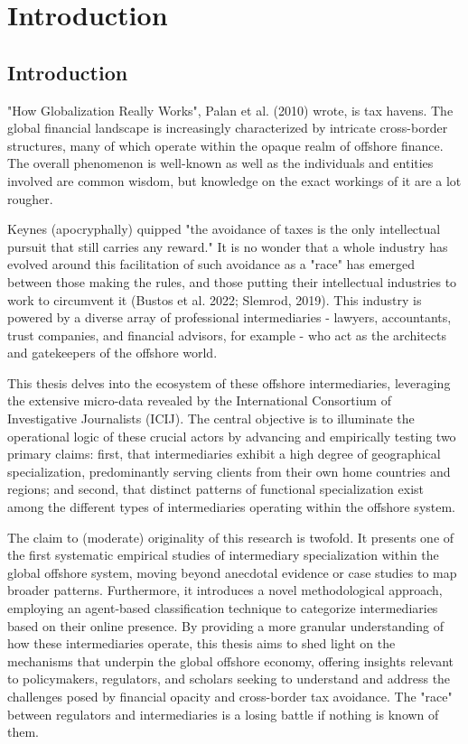 \chapter{Introduction}
\label{chap:introduction}

\section{Introduction} 
\label{sec:1_0}

"How Globalization Really Works", Palan et al. (2010) wrote, is tax havens. The global financial landscape is increasingly characterized by intricate cross-border structures, many of which operate within the opaque realm of offshore finance. The overall phenomenon is well-known as well as the individuals and entities involved are common wisdom, but knowledge on the exact workings of it are a lot rougher.

Keynes (apocryphally) quipped "the avoidance of taxes is the only intellectual pursuit that still carries any reward." It is no wonder that a whole industry has evolved around this facilitation of such avoidance as a "race" has emerged between those making the rules, and those putting their intellectual industries to work to circumvent it (Bustos et al. 2022; Slemrod, 2019). This industry is powered by a diverse array of professional intermediaries - lawyers, accountants, trust companies, and financial advisors, for example - who act as the architects and gatekeepers of the offshore world.

This thesis delves into the ecosystem of these offshore intermediaries, leveraging the extensive micro-data revealed by the International Consortium of Investigative Journalists (ICIJ). The central objective is to illuminate the operational logic of these crucial actors by advancing and empirically testing two primary claims: first, that intermediaries exhibit a high degree of geographical specialization, predominantly serving clients from their own home countries and regions; and second, that distinct patterns of functional specialization exist among the different types of intermediaries operating within the offshore system.

The claim to (moderate) originality of this research is twofold. It presents one of the first systematic empirical studies of intermediary specialization within the global offshore system, moving beyond anecdotal evidence or case studies to map broader patterns. Furthermore, it introduces a novel methodological approach, employing an agent-based classification technique to categorize intermediaries based on their online presence. By providing a more granular understanding of how these intermediaries operate, this thesis aims to shed light on the mechanisms that underpin the global offshore economy, offering insights relevant to policymakers, regulators, and scholars seeking to understand and address the challenges posed by financial opacity and cross-border tax avoidance. The "race" between regulators and intermediaries is a losing battle if nothing is known of them.

